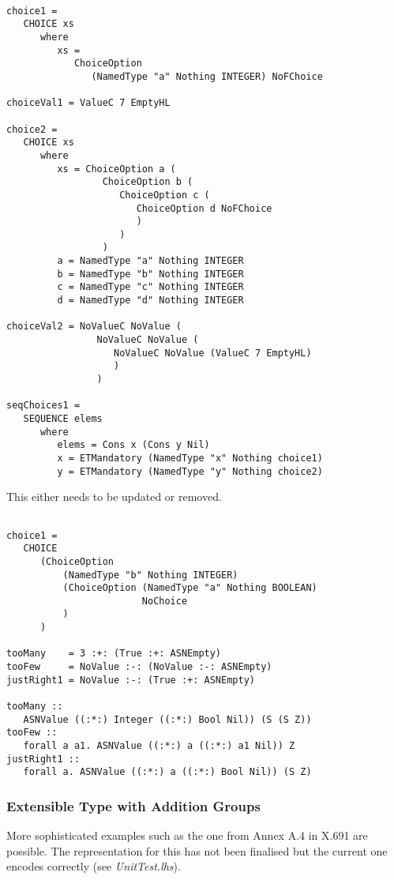 \documentclass{article}
\begin{document}
\begin{lstlisting}[frame=single]

choice1 = 
   CHOICE xs 
      where
         xs = 
            ChoiceOption 
               (NamedType "a" Nothing INTEGER) NoFChoice

choiceVal1 = ValueC 7 EmptyHL

choice2 = 
   CHOICE xs
      where
         xs = ChoiceOption a (
                 ChoiceOption b (
                    ChoiceOption c (
                       ChoiceOption d NoFChoice
                       )
                    )
                 )
         a = NamedType "a" Nothing INTEGER
         b = NamedType "b" Nothing INTEGER
         c = NamedType "c" Nothing INTEGER
         d = NamedType "d" Nothing INTEGER

choiceVal2 = NoValueC NoValue (
                NoValueC NoValue (
                   NoValueC NoValue (ValueC 7 EmptyHL)
                   )
                )

seqChoices1 = 
   SEQUENCE elems
      where
         elems = Cons x (Cons y Nil)
         x = ETMandatory (NamedType "x" Nothing choice1)
         y = ETMandatory (NamedType "y" Nothing choice2)

\end{lstlisting}

This either needs to be updated or removed.

\begin{lstlisting}[frame=single]

choice1 = 
   CHOICE 
      (ChoiceOption 
          (NamedType "b" Nothing INTEGER) 
          (ChoiceOption (NamedType "a" Nothing BOOLEAN) 
                        NoChoice
          )
      )

tooMany    = 3 :+: (True :+: ASNEmpty)
tooFew     = NoValue :-: (NoValue :-: ASNEmpty)
justRight1 = NoValue :-: (True :+: ASNEmpty)

tooMany :: 
   ASNValue ((:*:) Integer ((:*:) Bool Nil)) (S (S Z))
tooFew :: 
   forall a a1. ASNValue ((:*:) a ((:*:) a1 Nil)) Z
justRight1 :: 
   forall a. ASNValue ((:*:) a ((:*:) Bool Nil)) (S Z)

\end{lstlisting}

\subsubsection{Extensible Type with Addition Groups}

More sophisticated examples such as the one from Annex A.4 in X.691 are
possible. The representation for this has not been finalised but the
current one encodes correctly (see {\em UnitTest.lhs}).
\end{document}
